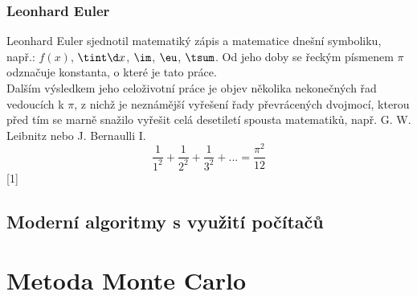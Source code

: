 \documentclass[rocnikovka]{gzwroc} %
\begin{document}
\subsubsection{Leonhard Euler}
Leonhard Euler sjednotil matematiký zápis a matematice dnešní symboliku, např.: $f(x)$, $\tint \d x$, $\im$, $\eu$, $\tsum$. Od jeho doby se řeckým písmenem $\pi$ odznačuje konstanta, o které je tato práce.\\
Dalším výsledkem jeho celoživotní práce je objev několika nekonečných řad vedoucích k $\pi$, z nichž je neznámější vyřešení řady převrácených dvojmocí, kterou před tím se marně snažilo vyřešit celá desetiletí spousta matematiků, např. G. W. Leibnitz nebo J. Bernaulli I.
$$
\frac{1}{1^2}+\frac{1}{2^2}+\frac{1}{3^2}+...=\frac{\pi^2}{12}
$$
[1]
\subsection{Moderní algoritmy s využití počítačů}
\section{Metoda Monte Carlo}
\end{document}
